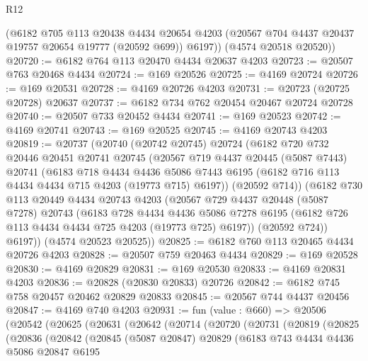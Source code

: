 \begin{lexlean}{R12}
\begin{coremodule}
        (@6182
          @705
          @113
          @20438
          @4434
          @20654
          @4203
          (@20567 @704 @4437 @20437 @19757 @20654 @19777 (@20592 @699))
          @6197))
      (@4574 @20518 @20520))
@20720 := @6182 @764 @113 @20470 @4434 @20637 @4203
@20723 := @20507 @763 @20468 @4434
@20724 := @169 @20526
@20725 := @4169 @20724
@20726 := @169 @20531
@20728 := @4169 @20726 @4203
@20731 := @20723 (@20725 @20728) @20637
@20737 := @6182 @734 @762 @20454 @20467 @20724 @20728
@20740 := @20507 @733 @20452 @4434
@20741 := @169 @20523
@20742 := @4169 @20741
@20743 := @169 @20525
@20745 := @4169 @20743 @4203
@20819 := @20737
    (@20740
      (@20742 @20745)
      @20724
      (@6182
        @720
        @732
        @20446
        @20451
        @20741
        @20745
        (@20567
          @719
          @4437
          @20445
          (@5087 @7443)
          @20741
          (@6183
            @718
            @4434
            @4436
            @5086
            @7443
            @6195
            (@6182 @716 @113 @4434 @4434 @715 @4203 (@19773 @715) @6197))
          (@20592 @714))
        (@6182
          @730
          @113
          @20449
          @4434
          @20743
          @4203
          (@20567
            @729
            @4437
            @20448
            (@5087 @7278)
            @20743
            (@6183
              @728
              @4434
              @4436
              @5086
              @7278
              @6195
              (@6182 @726 @113 @4434 @4434 @725 @4203 (@19773 @725) @6197))
            (@20592 @724))
          @6197))
      (@4574 @20523 @20525))
@20825 := @6182 @760 @113 @20465 @4434 @20726 @4203
@20828 := @20507 @759 @20463 @4434
@20829 := @169 @20528
@20830 := @4169 @20829
@20831 := @169 @20530
@20833 := @4169 @20831 @4203
@20836 := @20828 (@20830 @20833) @20726
@20842 := @6182 @745 @758 @20457 @20462 @20829 @20833
@20845 := @20567 @744 @4437 @20456
@20847 := @4169 @740 @4203
@20931 := fun (value : @660) =>
  @20506
    (@20542
      (@20625
        (@20631
          (@20642
            (@20714
              (@20720
                (@20731
                  (@20819
                    (@20825
                      (@20836
                        (@20842
                          (@20845
                            (@5087 @20847)
                            @20829
                            (@6183
                              @743
                              @4434
                              @4436
                              @5086
                              @20847
                              @6195

\end{coremodule}
\end{lexlean}

